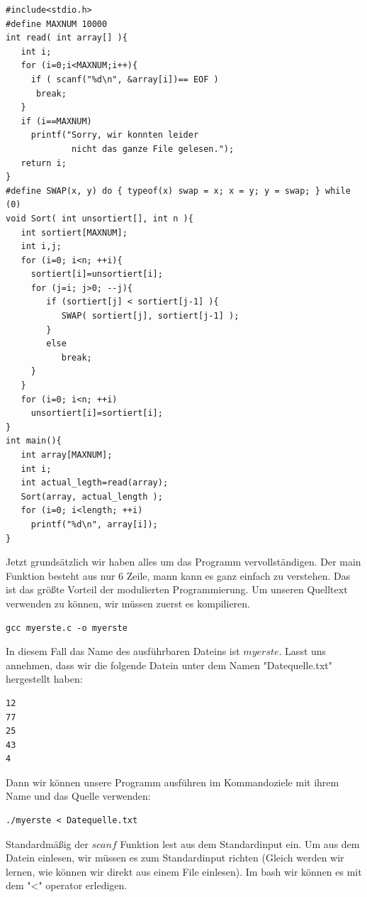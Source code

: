 \documentclass{article}[12pt]
\newenvironment{myexampleprogram}[1]{%
    \tcolorbox[beamer,%
    noparskip,breakable,
    colback=White,colframe=Goldenrod,%
    colbacklower=Yellow!75!White,%
    title=#1]}%
    {\endtcolorbox}
\begin{document}
\begin{myexampleprogram}{ Programme: \texttt{Einfügesortieren}}
\begin{lstlisting}
#include<stdio.h>
#define MAXNUM 10000
int read( int array[] ){
   int i;
   for (i=0;i<MAXNUM;i++){
     if ( scanf("%d\n", &array[i])== EOF )
      break;
   }
   if (i==MAXNUM)
     printf("Sorry, wir konnten leider
             nicht das ganze File gelesen.");
   return i;
}
#define SWAP(x, y) do { typeof(x) swap = x; x = y; y = swap; } while (0)
void Sort( int unsortiert[], int n ){
   int sortiert[MAXNUM];
   int i,j;
   for (i=0; i<n; ++i){
     sortiert[i]=unsortiert[i];
     for (j=i; j>0; --j){
        if (sortiert[j] < sortiert[j-1] ){
           SWAP( sortiert[j], sortiert[j-1] );
        }
        else
           break;
     }
   }
   for (i=0; i<n; ++i)
     unsortiert[i]=sortiert[i];
}
int main(){
   int array[MAXNUM];
   int i;
   int actual_legth=read(array);
   Sort(array, actual_length );
   for (i=0; i<length; ++i)
     printf("%d\n", array[i]); 
}
\end{lstlisting}
Jetzt grundsätzlich wir haben alles um das Programm vervollständigen.
Der main Funktion besteht aus nur 6 Zeile, mann kann es ganz einfach zu verstehen. Das
ist das größte Vorteil der modulierten Programmierung. Um unseren Quelltext verwenden zu können,
wir müssen zuerst es kompilieren.
\begin{lstlisting}
gcc myerste.c -o myerste
\end{lstlisting}
In diesem Fall das Name des ausführbaren Dateins ist $myerste$. Lasst uns annehmen, dass wir die folgende Datein unter dem Namen "Datequelle.txt" 
hergestellt haben:
\begin{lstlisting}
12
77
25
43
4
\end{lstlisting}
Dann wir können unsere Programm ausführen im Kommandoziele mit ihrem Name und das Quelle verwenden:
\begin{lstlisting}
./myerste < Datequelle.txt
\end{lstlisting}
Standardmäßig der $scanf$ Funktion lest aus dem Standardinput ein. Um aus dem Datein einlesen, wir müssen es
zum Standardinput richten  (Gleich werden wir lernen, wie können wir direkt aus einem File einlesen). Im bash 
wir können es mit dem "<" operator erledigen.
\end{myexampleprogram}
\end{document}
